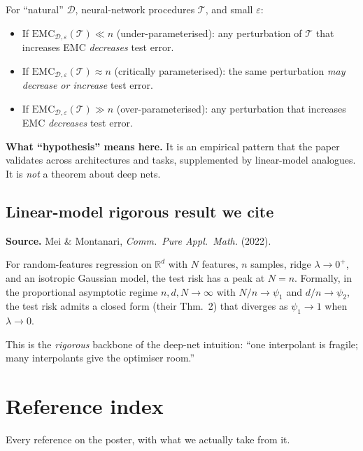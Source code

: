 \documentclass[11pt,a4paper]{article}
\newcommand{\T}{\mathcal{T}}
\newcommand{\D}{\mathcal{D}}
\theoremstyle{definition}
\begin{document}
For ``natural'' $\D$, neural-network procedures $\T$, and small $\varepsilon$:
\begin{itemize}
\item If $\mathrm{EMC}_{\D,\varepsilon}(\T) \ll n$ (under-parameterised): any perturbation of $\T$ that increases EMC \emph{decreases} test error.
\item If $\mathrm{EMC}_{\D,\varepsilon}(\T) \approx n$ (critically parameterised): the same perturbation \emph{may decrease or increase} test error.
\item If $\mathrm{EMC}_{\D,\varepsilon}(\T) \gg n$ (over-parameterised): any perturbation that increases EMC \emph{decreases} test error.
\end{itemize}

\noindent\textbf{What ``hypothesis'' means here.} It is an empirical pattern that the paper validates across architectures and tasks, supplemented by linear-model analogues. It is \emph{not} a theorem about deep nets.

\subsection{Linear-model rigorous result we cite}

\noindent\textbf{Source.} Mei \& Montanari, \emph{Comm.\ Pure Appl.\ Math.} (2022).

For random-features regression on $\mathbb{R}^d$ with $N$ features, $n$ samples, ridge $\lambda\to 0^+$, and an isotropic Gaussian model, the test risk has a peak at $N = n$. Formally, in the proportional asymptotic regime $n,d,N \to\infty$ with $N/n\to\psi_1$ and $d/n\to\psi_2$, the test risk admits a closed form (their Thm.~2) that diverges as $\psi_1\to 1$ when $\lambda\to 0$.

This is the \emph{rigorous} backbone of the deep-net intuition: ``one interpolant is fragile; many interpolants give the optimiser room.''

\section{Reference index}

Every reference on the poster, with what we actually take from it.
\end{document}
